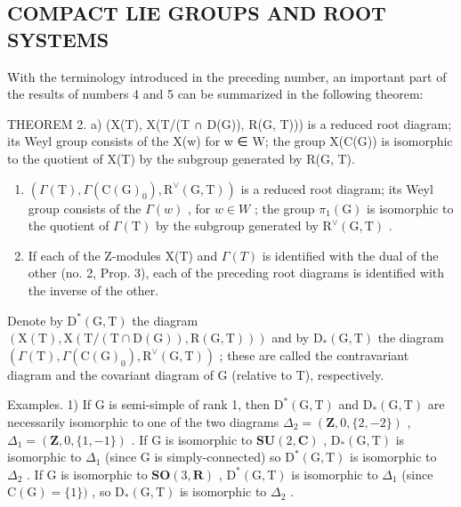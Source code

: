 \subsection{COMPACT LIE GROUPS AND ROOT SYSTEMS}

With the terminology introduced in the preceding number, an important part of the results of numbers 4 and 5 can be summarized in the following theorem:

THEOREM 2. a) (X(T), X(T/(T ∩ D(G)), R(G, T))) is a reduced root diagram; its Weyl group consists of the X(w) for w ∈ W; the group X(C(G)) is isomorphic to the quotient of X(T) by the subgroup generated by R(G, T).

\begin{enumerate}
\def\labelenumi{\alph{enumi})}
\setcounter{enumi}{1}
\item
  \((\Gamma(\mathrm{T}),\Gamma(\mathrm{C}(\mathrm{G})_{0}),\mathrm{R}^{\vee}(\mathrm{G},\mathrm{T}))\) is a reduced root diagram; its Weyl group consists of the \(\Gamma(w)\) , for \(w\in W\) ; the group \(\pi_{1}(\mathrm{G})\) is isomorphic to the quotient of \(\Gamma(\mathrm{T})\) by the subgroup generated by \(\mathrm{R}^{\vee}(\mathrm{G},\mathrm{T})\) .
\item
  If each of the Z-modules X(T) and \(\Gamma(T)\) is identified with the dual of the other (no. 2, Prop. 3), each of the preceding root diagrams is identified with the inverse of the other.
\end{enumerate}

Denote by \(\mathrm{D}^{*}(\mathrm{G},\mathrm{T})\) the diagram \((\mathrm{X}(\mathrm{T}),\mathrm{X}(\mathrm{T}/(\mathrm{T}\cap\mathrm{D}(\mathrm{G})),\mathrm{R}(\mathrm{G},\mathrm{T})))\) and by \(\mathrm{D}_{*}(\mathrm{G},\mathrm{T})\) the diagram \((\varGamma(\mathrm{T}),\varGamma(\mathrm{C}(\mathrm{G})_{0}),\mathrm{R}^{\vee}(\mathrm{G},\mathrm{T}))\) ; these are called the contravariant diagram and the covariant diagram of G (relative to T), respectively.

Examples. 1) If G is semi-simple of rank 1, then \(\mathrm{D}^{*}(\mathrm{G},\mathrm{T})\) and \(\mathrm{D}_{*}(\mathrm{G},\mathrm{T})\) are necessarily isomorphic to one of the two diagrams \(\Delta_{2}=(\mathbf{Z},0,\{2,-2\})\) , \(\Delta_{1}=(\mathbf{Z},0,\{1,-1\})\) . If G is isomorphic to \(\mathbf{SU}(2,\mathbf{C})\) , \(\mathrm{D}_{*}(\mathrm{G},\mathrm{T})\) is isomorphic to \(\Delta_{1}\) (since G is simply-connected) so \(\mathrm{D}^{*}(\mathrm{G},\mathrm{T})\) is isomorphic to \(\Delta_{2}\) . If G is isomorphic to \(\mathbf{SO}(3,\mathbf{R})\) , \(\mathrm{D}^{*}(\mathrm{G},\mathrm{T})\) is isomorphic to \(\Delta_{1}\) (since \(\mathrm{C}(\mathrm{G})=\{1\})\) , so \(\mathrm{D}_{*}(\mathrm{G},\mathrm{T})\) is isomorphic to \(\Delta_{2}\) .

